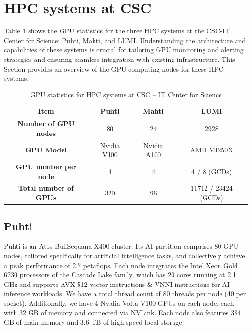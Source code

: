 
\section{HPC systems at CSC}
\label{sec:hpc}
Table \ref{tab:gpu_details} shows the GPU statistics for the three HPC systems at the CSC-IT Center for Science: Puhti, Mahti, and LUMI. Understanding the architecture and capabilities of these systems is crucial for tailoring GPU monitoring and alerting strategies and ensuring seamless integration with existing infrastructure. This Section provides an overview of the GPU computing nodes for these HPC systems.

\begin{table}[H]
    \centering
    \begin{tabular}{|c|ccc|}
     \hline
     \textbf{Item} & \textbf{Puhti} & \textbf{Mahti} & \textbf{LUMI} \\
     \hline
     \textbf{Number of GPU nodes} & 80 & 24 & 2928 \\
     \hline
     \textbf{GPU Model} & Nvidia V100 & Nvidia A100 & AMD MI250X \\
     \hline
     \textbf{GPU number per node} & 4 & 4 & 4 / 8 (GCDs) \\
     \hline
     \textbf{Total number of GPUs} & 320 & 96 & 11712 / 23424 (GCDs) \\
     \hline
    \end{tabular}
    \caption{GPU statistics for HPC systems at CSC -- IT Center for Science}
    \label{tab:gpu_details}
\end{table}

\subsection{Puhti}
Puhti \cite{puhti} is an Atos BullSequana X400 cluster. Its AI partition comprises 80 GPU nodes, tailored specifically for artificial intelligence tasks, and collectively achieve a peak performance of 2.7 petaflops. Each node integrates the Intel Xeon Gold 6230 processors of the Cascade Lake family, which has 20 cores running at 2.1 GHz and supports AVX-512 vector instructions \& VNNI instructions for AI inference workloads. We have a total thread count of 80 threads per node (40 per socket). Additionally, we have 4 Nvidia Volta V100 GPUs on each node, each with 32 GB of memory and connected via NVLink. Each node also features 384 GB of main memory and 3.6 TB of high-speed local storage.

